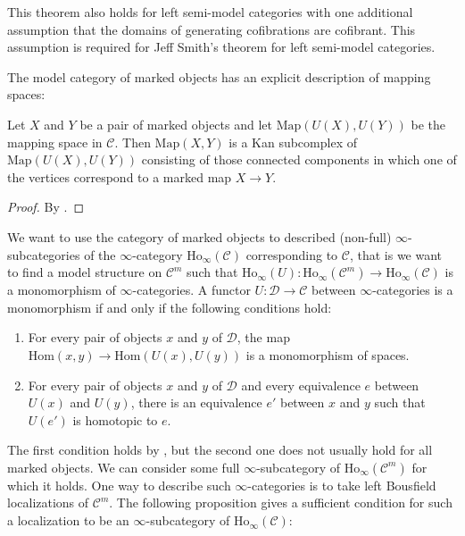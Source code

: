 \documentclass[reqno]{amsart}
\theoremstyle{definition}
\theoremstyle{remark}
\newcommand{\fs}[1]{\mathrm{#1}}
\newcommand{\Hom}{\fs{Hom}}
\newcommand{\Ho}{\fs{Ho}}
\newcommand{\cat}[1]{\mathcal{#1}}
\newcommand{\C}{\cat{C}}
\newcommand{\D}{\cat{D}}
\numberwithin{figure}{section}
\begin{document}
\begin{remark}
This theorem also holds for left semi-model categories with one additional assumption that the domains of generating cofibrations are cofibrant.
This assumption is required for Jeff Smith's theorem for left semi-model categories.
\end{remark}

The model category of marked objects has an explicit description of mapping spaces:

\begin{lem}
Let $X$ and $Y$ be a pair of marked objects and let $\mathrm{Map}(U(X),U(Y))$ be the mapping space in $\C$.
Then $\mathrm{Map}(X,Y)$ is a Kan subcomplex of $\mathrm{Map}(U(X),U(Y))$ consisting of those connected components in which one of the vertices correspond to a marked map $X \to Y$.
\end{lem}
\begin{proof}
By \cite[Lemma~3.4]{marked-obj}.
\end{proof}

We want to use the category of marked objects to described (non-full) $\infty$-subcategories of the $\infty$-category $\Ho_\infty(\C)$ corresponding to $\C$,
that is we want to find a model structure on $\C^m$ such that $\Ho_\infty(U) : \Ho_\infty(\C^m) \to \Ho_\infty(\C)$ is a monomorphism of $\infty$-categories.
A functor $U : \D \to \C$ between $\infty$-categories is a monomorphism if and only if the following conditions hold:
\begin{enumerate}
\item \label{it:mono-hom} For every pair of objects $x$ and $y$ of $\D$, the map $\Hom(x,y) \to \Hom(U(x),U(y))$ is a monomorphism of spaces.
\item \label{it:mono-eq} For every pair of objects $x$ and $y$ of $\D$ and every equivalence $e$ between $U(x)$ and $U(y)$, there is an equivalence $e'$ between $x$ and $y$ such that $U(e')$ is homotopic to $e$.
\end{enumerate}

The first condition holds by , but the second one does not usually hold for all marked objects.
We can consider some full $\infty$-subcategory of $\Ho_\infty(\C^m)$ for which it holds.
One way to describe such $\infty$-categories is to take left Bousfield localizations of $\C^m$.
The following proposition gives a sufficient condition for such a localization to be an $\infty$-subcategory of $\Ho_\infty(\C)$:
\end{document}
